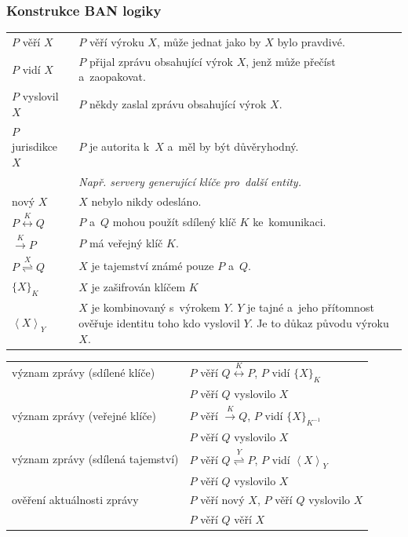 \begin{itemize}
\subsubsection{Konstrukce BAN logiky}

\begin{tabularx}{\textwidth}{lX}
$P$ věří $X$ & $P$ věří výroku $X$, může jednat jako by $X$ bylo pravdivé. \\
$P$ vidí $X$ & $P$ přijal zprávu obsahující výrok $X$, jenž může přečíst a~zaopakovat. \\
$P$ vyslovil $X$ & $P$ někdy zaslal zprávu obsahující výrok $X$. \\
$P$ jurisdikce $X$ & $P$ je autorita k~$X$ a~měl by být důvěryhodný. \\
& \emph{Např. servery generující klíče pro~další entity.} \\
nový $X$ & $X$ nebylo nikdy odesláno. \\
$P \stackrel{K}{\leftrightarrow} Q$ & $P$ a~$Q$ mohou použít sdílený klíč $K$ ke~komunikaci. \\
$\stackrel{K}{\rightarrow} P$ & $P$ má veřejný klíč $K$. \\
$P \stackrel{X}{\rightleftharpoons} Q$ & $X$ je tajemství známé pouze $P$ a~$Q$. \\
$\{X\}_K$ & $X$ je zašifrován klíčem $K$ \\
$\left<X\right>_Y$ & $X$ je kombinovaný s~výrokem $Y$. $Y$ je tajné a~jeho přítomnost ověřuje identitu toho kdo vyslovil $Y$. Je to důkaz původu výroku $X$. \\
\end{tabularx}

\begin{tabular}{ll}
význam zprávy (sdílené klíče)
& $P$ věří $Q \stackrel{K}{\leftrightarrow} P$, $P$ vidí $\{X\}_K$ \\
& $P$ věří $Q$ vyslovilo $X$ \\
význam zprávy (veřejné klíče) & $P$ věří $\stackrel{K}{\rightarrow} Q$, $P$ vidí $\{X\}_{K^{-1}}$ \\
& $P$ věří $Q$ vyslovilo $X$ \\
význam zprávy (sdílená tajemství) & $P$ věří $Q \stackrel{Y}{\rightleftharpoons} P$, $P$ vidí $\left<X\right>_Y$ \\
& $P$ věří $Q$ vyslovilo $X$ \\

ověření aktuálnosti zprávy
& $P$ věří nový $X$, $P$ věří $Q$ vyslovilo $X$ \\
& $P$ věří $Q$ věří $X$ \\


\end{tabular}
\end{itemize}
